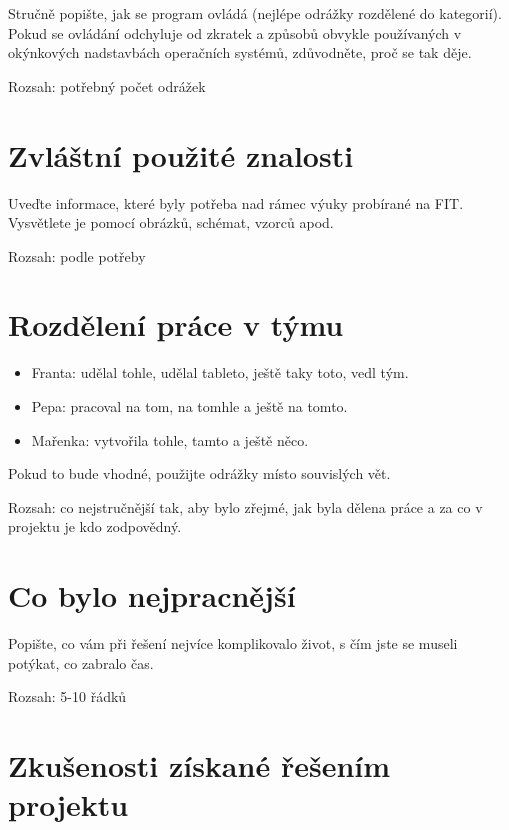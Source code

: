 \documentclass[11pt,a4paper]{article}
\begin{document}
Stručně popište, jak se program ovládá (nejlépe odrážky rozdělené do
kategorií). Pokud se ovládání odchyluje od zkratek a způsobů obvykle
používaných v okýnkových nadstavbách operačních systémů, zdůvodněte, proč se
tak děje.

Rozsah: potřebný počet odrážek

\section{Zvláštní použité znalosti}

Uveďte informace, které byly potřeba nad rámec výuky probírané na FIT.
Vysvětlete je pomocí obrázků, schémat, vzorců apod.

Rozsah: podle potřeby

\section{Rozdělení práce v týmu}

\begin{itemize}
\item Franta: udělal tohle, udělal tableto, ještě taky toto, vedl tým.
\item Pepa: pracoval na tom, na tomhle a ještě na tomto.
\item Mařenka: vytvořila tohle, tamto a ještě něco.
\end{itemize}
Pokud to bude vhodné, použijte odrážky místo souvislých vět.

Rozsah: co nejstručnější tak, aby bylo zřejmé, jak byla dělena práce a za co v
projektu je kdo zodpovědný.

\section{Co bylo nejpracnější}

Popište, co vám při řešení nejvíce komplikovalo život, s čím jste se museli
potýkat, co zabralo čas.

Rozsah: 5-10 řádků

\section{Zkušenosti získané řešením projektu}
\end{document}
